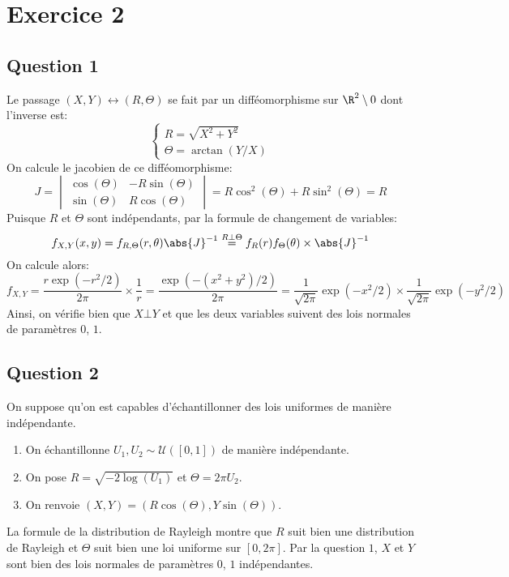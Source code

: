 \documentclass[math, info]{mpb-cours}
\begin{document}
\section{Exercice 2}
\subsection{Question 1}
Le passage $(X, Y) \leftrightarrow (R, \Theta)$ se fait par un difféomorphisme sur $\R^{2} \setminus 0$ dont l'inverse est:
\begin{equation*}
	\begin{cases}
		R = \sqrt{X^{2} + Y^{2}} \\
		\Theta = \arctan(Y / X)
	\end{cases}
\end{equation*}
On calcule le jacobien de ce difféomorphisme:
\begin{equation*}
	J =
	\begin{vmatrix}
		\cos(\Theta) & -R \sin(\Theta) \\
		\sin(\Theta) & R\cos(\Theta)
	\end{vmatrix} = R\cos^{2}(\Theta) + R\sin^{2}(\Theta) = R
\end{equation*}
Puisque $R$ et $\Theta$ sont indépendants, par la formule de changement de variables:
\begin{equation*}
	f_{X, Y}(x, y) = f_{R, \Theta}(r, \theta) \abs{J}^{- 1} \overset{R \bot \Theta}{=}f_{R}(r)f_{\Theta}(\theta) \times \abs{J}^{-1}
\end{equation*}
On calcule alors:
\begin{equation*}
	f_{X, Y} = \frac{r\exp(-r^{2}/2)}{2\pi} \times \frac{1}{r} = \frac{\exp(-(x^{2} + y^{2})/ 2)}{2\pi} = \frac{1}{\sqrt{2\pi}}\exp(-x^{2}/2)\times \frac{1}{\sqrt{2\pi}}\exp(-y^{2}/2)
\end{equation*}
Ainsi, on vérifie bien que $X \bot Y$ et que les deux variables suivent des lois normales de paramètres $0$, $1$.

\subsection{Question 2}
On suppose qu'on est capables d'échantillonner des lois uniformes de manière indépendante.
\begin{algorithm}
	\begin{enumerate}
		\item On échantillonne $U_{1}, U_{2} \sim \mathcal{U}([0, 1])$ de manière indépendante.
		\item On pose $R = \sqrt{-2 \log(U_{1})}$ et $\Theta = 2\pi U_{2}$.
		\item On renvoie $(X, Y) = (R\cos(\Theta), Y\sin(\Theta))$.
	\end{enumerate}
\end{algorithm}
La formule de la distribution de Rayleigh montre que $R$ suit bien une distribution de Rayleigh et $\Theta$ suit bien une loi uniforme sur $[0, 2\pi]$.
Par la question $1$, $X$ et $Y$ sont bien des lois normales de paramètres $0$, $1$ indépendantes.
\end{document}
